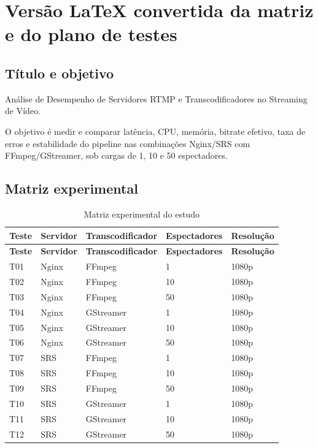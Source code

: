 \section{Versão LaTeX convertida da matriz e do plano de testes}

\subsection{Título e objetivo}

Análise de Desempenho de Servidores RTMP e Transcodificadores no Streaming de Vídeo.

O objetivo é medir e comparar latência, CPU, memória, bitrate efetivo, taxa de erros e estabilidade do pipeline nas combinações Nginx/SRS com FFmpeg/GStreamer, sob cargas de 1, 10 e 50 espectadores.

\subsection{Matriz experimental}

\begin{longtable}{@{}lllll@{}}
\caption{Matriz experimental do estudo}\\
\toprule
\textbf{Teste} & \textbf{Servidor} & \textbf{Transcodificador} & \textbf{Espectadores} & \textbf{Resolução} \\
\midrule
\endfirsthead
\toprule
\textbf{Teste} & \textbf{Servidor} & \textbf{Transcodificador} & \textbf{Espectadores} & \textbf{Resolução} \\
\midrule
\endhead
T01 & Nginx & FFmpeg & 1 & 1080p \\
T02 & Nginx & FFmpeg & 10 & 1080p \\
T03 & Nginx & FFmpeg & 50 & 1080p \\
T04 & Nginx & GStreamer & 1 & 1080p \\
T05 & Nginx & GStreamer & 10 & 1080p \\
T06 & Nginx & GStreamer & 50 & 1080p \\
T07 & SRS & FFmpeg & 1 & 1080p \\
T08 & SRS & FFmpeg & 10 & 1080p \\
T09 & SRS & FFmpeg & 50 & 1080p \\
T10 & SRS & GStreamer & 1 & 1080p \\
T11 & SRS & GStreamer & 10 & 1080p \\
T12 & SRS & GStreamer & 50 & 1080p \\
\bottomrule
\end{longtable}

